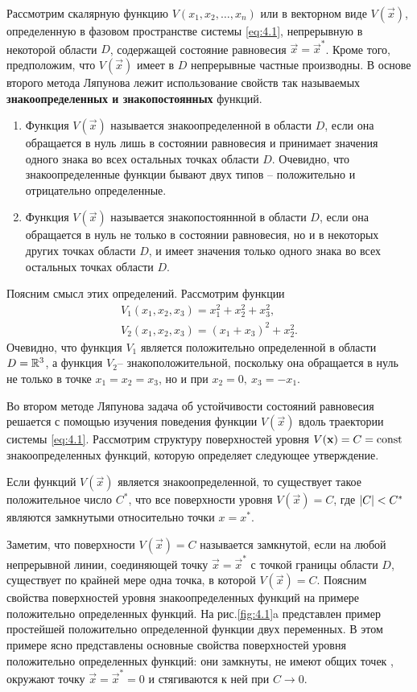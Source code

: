 Рассмотрим скалярную функцию $V(x_1,x_2,\dots,x_n)$ или в векторном виде $V(\vec x)$, определенную в фазовом пространстве системы \eqref{eq:4.1}, непрерывную в некоторой области $D$, содержащей состояние равновесия $\vec x= \vec x^*$. Кроме того, предположим, что $V(\vec x)$ имеет в $D$ непрерывные частные производны. В основе второго метода Ляпунова лежит использование свойств так называемых 
\textbf{знакоопределенных и знакопостоянных} функций.
\begin{enumerate}
        \item Функция $V(\vec x)$ называется знакоопределенной в области $D$, если она обращается в нуль лишь в состоянии равновесия и принимает значения одного знака во всех остальных точках области $D$. Очевидно, что знакоопределенные функции бывают двух типов -- положительно и отрицательно определенные. 
        \item Функция $V(\vec x)$ называется знакопостояннной в области $D$, если она обращается в нуль не только в состоянии равновесия, но и в некоторых других точках области $D$, и имеет значения только одного знака во всех остальных точках области $D$.
\end{enumerate}

Поясним смысл этих определений. Рассмотрим функции
\begin{equation}
        \label{eq:}
        \begin{gathered}
        V_1( x_1, x_2,x_3) = x_1^2 +x_2^2 +x_3^2, \\
        V_2(x_1,x_2,x_3)= (x_1+x_3)^2 +x_2^2.
        \end{gathered}
\end{equation}
Очевидно, что функция $V_1$ является положительно определенной в области $D= \mathbb{R}^3$, а функция $V_2$-- знакоположительной, поскольку она обращается в нуль не только в точке $x_1=x_2=x_3$, но и при $x_2=0, ~ x_3=-x_1$.

Во втором методе Ляпунова задача об устойчивости состояний равновесия решается с помощью изучения поведения функции $V(\vec x)$ вдоль траектории системы \eqref{eq:4.1}. Рассмотрим структуру поверхностей уровня $V(\mathbf x) = C= \textrm{const}$ знакоопределенных функций, которую определяет следующее утверждение.

Если функций $V(\vec x)$ является знакоопределенной, то существует такое положительное число $C^*$, что все поверхности уровня $V(\vec x)=C$, где $\abs{C} < C^*$ являются замкнутыми относительно точки $x=x^*$. 

Заметим, что поверхности $V(\vec x) = C$ называется замкнутой, если на любой непрерывной линии, соединяющей точку $\vec x = \vec x^*$ с точкой границы области $D$, существует по крайней мере одна точка, в которой $V(\vec x) =C$. Поясним свойства поверхностей уровня знакоопределенных функций на примере положительно определенных функций. На рис.\ref{fig:4.1}a представлен пример простейшей положительно определенной функции двух переменных. В этом примере ясно представлены основные свойства поверхностей уровня положительно определенных функций: они замкнуты, не имеют общих точек
, окружают точку $\vec x = \vec x^* =0$ и стягиваются к ней при $C \to 0$.


